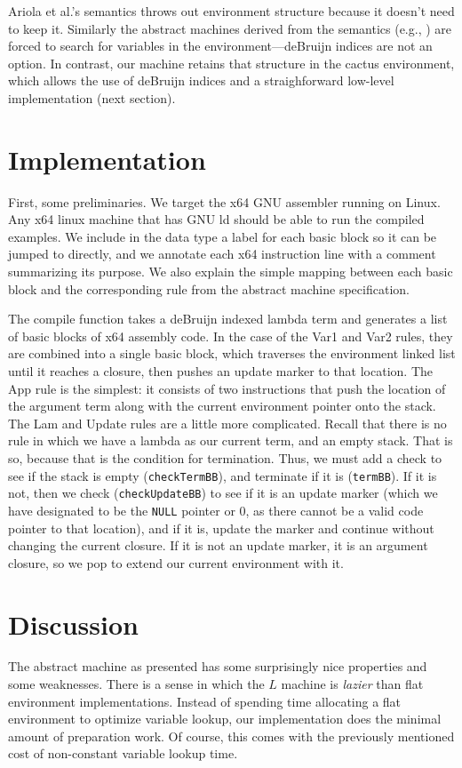 \documentclass[preprint]{sigplanconf}
\begin{document}
Ariola et al.'s semantics throws out environment structure because it doesn't
need to keep it. Similarly the abstract machines derived from the semantics
(e.g., \cite{garcia2009lazy}) are forced to search for variables in the
environment---deBruijn indices are not an option. In contrast, our
machine retains that structure in the cactus environment, which allows the use
of deBruijn indices and a straighforward low-level implementation (next
section).

\section{Implementation}\label{sec:impl}

First, some preliminaries. We target the x64 GNU assembler running on
Linux. Any x64 linux machine that has GNU ld should be able to run the
compiled examples.  We include in the data type a label for each basic
block so it can be jumped to directly, and we annotate each x64
instruction line with a comment summarizing its purpose.  We also
explain the simple mapping between each basic block and the
corresponding rule from the abstract machine specification.

The compile function takes a deBruijn indexed lambda term and
generates a list of basic blocks of x64 assembly code. In the case of the Var1
and Var2 rules, they are combined into a single basic block, which traverses the
environment linked list until it reaches a closure, then pushes an update marker
to that location. The App rule is the simplest: it consists of two instructions
that push the location of the argument term along with the current environment
pointer onto the stack. The Lam and Update rules are a little more complicated.
Recall that there is no rule in which we have a lambda as our current term, and
an empty stack. That is so, because that is the condition for termination. Thus, we
must add a check to see if the stack is empty (\texttt{checkTermBB}), and terminate if it
is (\texttt{termBB}). If it is not, then we check (\texttt{checkUpdateBB})
to see if it is an update marker (which
we have designated to be the \texttt{NULL} pointer or 0, as there cannot be a valid code
pointer to that location), and if it is,
update the marker and continue without changing the current closure. If it is
not an update marker, it is an argument closure, so we pop to extend our current
environment with it. 



\section{Discussion}
The abstract machine as presented has some surprisingly nice properties and some
weaknesses. There is a sense in which the $L$ machine is \emph{lazier} than flat
environment implementations. Instead of spending time allocating a flat
environment to optimize variable lookup, our implementation does the minimal
amount of preparation work. Of course, this comes with the previously mentioned
cost of non-constant variable lookup time. 
\end{document}
